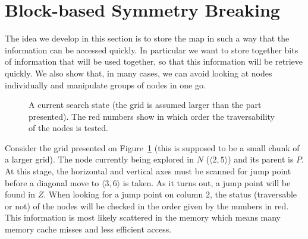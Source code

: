 \section{Block-based Symmetry Breaking}
\label{sec::blocks2}

The idea we develop in this section 
is to store the map in such a way 
that the information can be accessed quickly.  
In particular we want to store together bits of information 
that will be used together, 
so that this information will be retrieve quickly.  
We also show that, in many cases, 
we can avoid looking at nodes individually 
and manipulate groups of nodes in one go.  

\begin{figure}[ht]
  \begin{center}
  \end{center}
  \caption{A current search state 
    (the grid is assumed larger than the part presented).
  The red numbers show in which order the traversability of the nodes 
  is tested.}
  \label{fig::gridforblocks}
\end{figure}

Consider the grid presented on Figure~\ref{fig::gridforblocks} 
(this is supposed to be a small chunk of a larger grid).  
The node currently being explored in $N$ ($\langle 2,5\rangle$)
and its parent is $P$.  
At this stage, the horizontal and vertical axes must be scanned 
for jump point before a diagonal move to $\langle 3,6\rangle$ is taken.  
As it turns out, a jump point will be found in $Z$.  
When looking for a jump point on column $2$, 
the status (traversable or not) of the nodes 
will be checked in the order given by the numbers in red.  
This information is most likely scattered in the memory 
which means many memory cache misses and less efficient access.  

